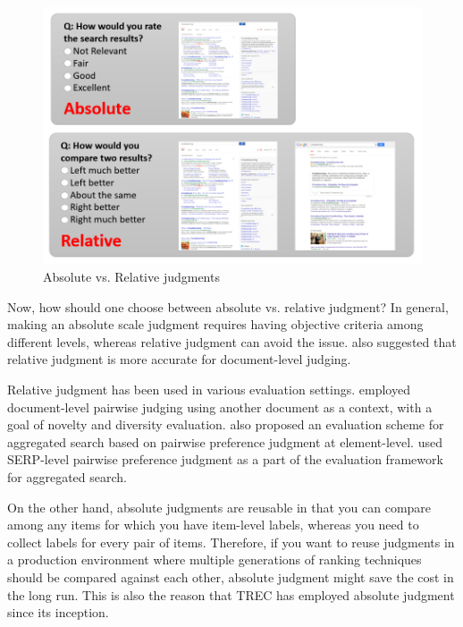 \documentclass[openany]{now} %
\begin{document}
\begin{figure}
	\begin{center}
		\includegraphics[scale=0.5]{images/judgment_types}
		\caption{Absolute vs. Relative judgments} 
		\label{fig:judgment_types}
	\end{center}
\end{figure}

Now, how should one choose between absolute vs. relative judgment? In general, making an absolute scale judgment requires having objective criteria among different levels, whereas relative judgment can avoid the issue. \cite{CarteretteBCD08} also suggested that relative judgment is more accurate for document-level judging.

Relative judgment has been used in various evaluation settings. \cite{Chandar2013} employed document-level pairwise judging using another document as a context, with a goal of novelty and diversity evaluation. \cite{Arguello:2011} also proposed an evaluation scheme for aggregated search based on pairwise preference judgment at element-level. \cite{Zhou:2012} used SERP-level pairwise preference judgment as a part of the evaluation framework for aggregated search.

On the other hand, absolute judgments are reusable in that you can compare among any items for which you have item-level labels, whereas you need to collect labels for every pair of items. Therefore, if you want to reuse judgments in a production environment where multiple generations of ranking techniques should be compared against each other, absolute judgment might save the cost in the long run. This is also the reason that TREC has employed absolute judgment since its inception.
\end{document}
